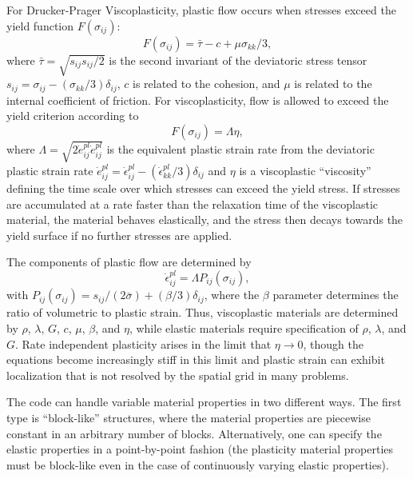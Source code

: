 \documentclass[12pt]{article}   	%
\begin{document}
For Drucker-Prager Viscoplasticity, plastic flow occurs when stresses exceed the yield function $F(\sigma_{ij})$:
\begin{equation}
F(\sigma_{ij}) = \bar{\tau}-c+\mu\sigma_{kk}/3,
\end{equation}
where $\bar{\tau}=\sqrt{s_{ij}s_{ij}/2}$ is the second invariant of the deviatoric stress tensor $s_{ij}=\sigma_{ij}-(\sigma_{kk}/3)\delta_{ij}$, $c$ is related to the cohesion, and $\mu$ is related to the internal coefficient of friction. For viscoplasticity, flow is allowed to exceed the yield criterion according to
\begin{equation}
F(\sigma_{ij})=\Lambda\eta,
\end{equation}
where $\Lambda=\sqrt{2\dot{e}^{pl}_{ij}\dot{e}^{pl}_{ij}}$ is the equivalent plastic strain rate from the deviatoric plastic strain rate $\dot{e}^{pl}_{ij}=\dot{\epsilon}^{pl}_{ij}-(\dot{\epsilon}^{pl}_{kk}/3)\delta_{ij}$ and $\eta$ is a viscoplastic ``viscosity'' defining the time scale over which stresses can exceed the yield stress. If stresses are accumulated at a rate faster than the relaxation time of the viscoplastic material, the material behaves elastically, and the stress then decays towards the yield surface if no further stresses are applied.

The components of plastic flow are determined by
\begin{equation}
\dot{\epsilon}^{pl}_{ij}=\Lambda P_{ij}\left(\sigma_{ij}\right),
\end{equation}
with $P_{ij}(\sigma_{ij})=s_{ij}/(2\bar{\sigma})+(\beta/3)\delta_{ij}$, where the $\beta$ parameter determines the ratio of volumetric to plastic strain. Thus, viscoplastic materials are determined by $\rho$, $\lambda$, $G$, $c$, $\mu$, $\beta$, and $\eta$, while elastic materials require specification of $\rho$, $\lambda$, and $G$. Rate independent plasticity arises in the limit that $\eta \rightarrow 0$, though the equations become increasingly stiff in this limit and plastic strain can exhibit localization that is not resolved by the spatial grid in many problems.

The code can handle variable material properties in two different ways. The first type is ``block-like'' structures, where the material properties are piecewise constant in an arbitrary number of blocks. Alternatively, one can specify the elastic properties in a point-by-point fashion (the plasticity material properties must be block-like even in the case of continuously varying elastic properties).
\end{document}

